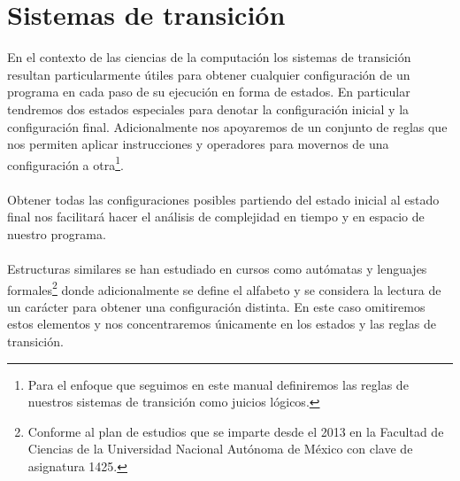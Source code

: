\section{Sistemas de transición}
    En el contexto de las ciencias de la computación los sistemas de transición resultan particularmente útiles para obtener cualquier configuración de un programa en cada paso de su ejecución en forma de estados. En particular tendremos dos estados especiales para denotar la configuración inicial y la configuración final. Adicionalmente nos apoyaremos de un conjunto de reglas que nos permiten aplicar instrucciones y operadores para movernos de una configuración a otra\footnote{ Para el enfoque que seguimos en este manual definiremos las reglas de nuestros sistemas de transición como juicios lógicos.}.\\\\
    Obtener todas las configuraciones posibles partiendo del estado inicial al estado final nos facilitará hacer el análisis de complejidad en tiempo y en espacio de nuestro programa.\\\\
    Estructuras similares se han estudiado en cursos como autómatas y lenguajes formales\footnote{Conforme al plan de estudios que se imparte desde el 2013 en la Facultad de Ciencias de la Universidad Nacional Autónoma de México con clave de asignatura 1425. } donde adicionalmente se define el alfabeto y se considera la lectura de un carácter para obtener una configuración distinta. En este caso omitiremos estos elementos y nos concentraremos únicamente en los estados y las reglas de transición.\\
